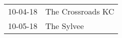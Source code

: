 \begin{supertabular}{p{0.07\textwidth}p{0.23\textwidth}}
 10-04-18 &  The Crossroads KC \\
 10-05-18 &         The Sylvee \\
\end{supertabular}
